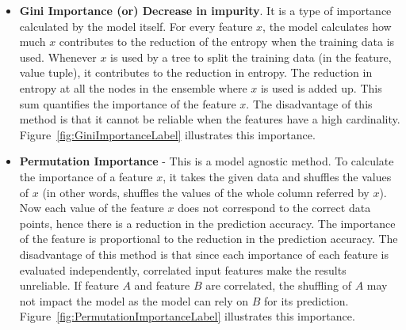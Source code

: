 \documentclass[11pt]{article}
\begin{document}
\begin{itemize}
\item \textbf{Gini Importance (or) Decrease in impurity}. It is a type of importance calculated by the model itself.
For every feature $x$, the model calculates how much $x$ contributes to the reduction of the entropy when the training data is used. Whenever $x$ is used by a tree to split the training data (in the feature, value tuple), it contributes to the reduction in entropy. The reduction in entropy at all the nodes in the ensemble where $x$ is used is added up. This sum quantifies the importance of the feature $x$.
The disadvantage of this method is that it cannot be reliable when the features have a high cardinality.  Figure~\ref{fig:GiniImportanceLabel} illustrates this importance.

\item \textbf{Permutation Importance} - This is a model agnostic method.
To calculate the importance of a feature $x$,  it takes the given data and shuffles the values of $x$ (in other words, shuffles the values of the whole column referred by $x$).  Now each value of the feature $x$ does not correspond to the correct data points, hence there is a reduction in the prediction accuracy.
The importance of the feature is proportional to the reduction in the prediction accuracy.
The disadvantage of this method is that since each importance of each feature is evaluated independently,  correlated input features make the results unreliable. 
If feature $A$ and feature $B$ are correlated,  the shuffling of $A$ may not impact the model as the model can rely on $B$ for its prediction.  Figure~\ref{fig:PermutationImportanceLabel} illustrates this importance.
\end{itemize}
\end{document}
